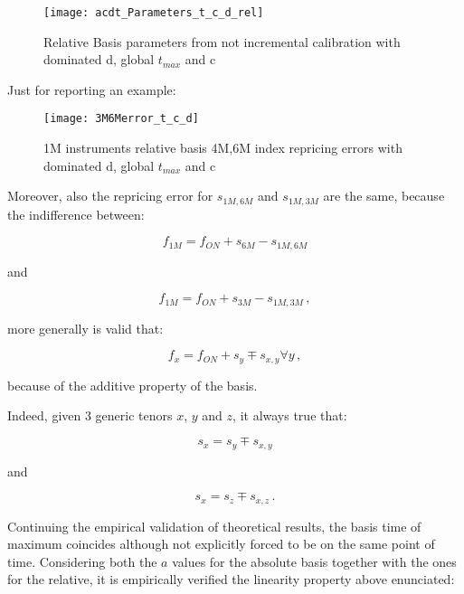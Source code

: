 \begin{figure}[H]
\centering
\texttt{[image: acdt\_Parameters\_t\_c\_d\_rel]}
\caption{Relative Basis parameters from not incremental calibration with dominated d, global $t_{max}$ and c}
\label{fig:acdt_Parameters_t_c_d_rel}
\end{figure}

Just for reporting an example:

\begin{figure}[H]
\centering
\texttt{[image: 3M6Merror\_t\_c\_d]}
\caption{1M instruments relative basis 4M,6M index repricing errors with dominated d, global $t_{max}$ and c}
\label{fig:3M6Merror_t_c_d}
\end{figure}

Moreover, also the repricing error for $s_{1M,6M}$ and $s_{1M,3M}$ are the same, because the indifference between:

\begin{equation*}
    f_{1M}=f_{ON} + s_{6M} - s_{1M,6M}
\end{equation*}

and

\begin{equation*}
    f_{1M}=f_{ON} + s_{3M} - s_{1M,3M}\,,
\end{equation*}

more generally is valid that:

\begin{equation*}
    f_{x}=f_{ON} + s_{y} \mp s_{x,y}  \forall y\,,
\end{equation*}

because of the additive property of the basis.

Indeed, given 3 generic tenors $x$, $y$ and $z$, it always true that:

\begin{equation*}
   s_{x}= s_{y} \mp s_{x,y} 
\end{equation*}

and 

\begin{equation*}
   s_{x}= s_{z} \mp s_{x,z} \,.
\end{equation*}

Continuing the empirical validation of theoretical results, the basis time of maximum coincides although not explicitly forced to be on the same point of time.
Considering both the $a$ values for the absolute basis together with the ones for the relative, it is empirically verified the linearity property above enunciated:

